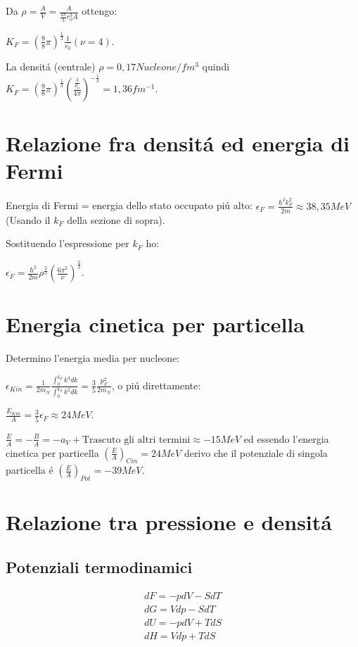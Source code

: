 \documentclass[main.tex]{subfiles}
\begin{document}
Da $\rho=\frac{A}{V}=\frac{A}{\frac{4\pi}{3}r_0^3A}$ ottengo:

$K_F=(\frac{9}{8}\pi)^{\frac{1}{3}}\frac{1}{r_0} (\nu=4)$.

La densit\'a (centrale) $\rho=0,17 Nucleone/fm^3$ quindi $K_F=(\frac{9}{8}\pi)^{\frac{1}{3}}(\frac{\frac{3}{\rho_0}}{4\pi})^{-\frac{1}{3}}=1,36 fm^{-1}$.

\section{Relazione fra densit\'a ed energia di Fermi}

Energia di Fermi = energia dello stato occupato pi\'u alto: $\epsilon_F=\frac{\hbar^2k_F^2}{2m}\approx 38,35 MeV$ (Usando il $k_F$ della sezione di sopra).

Sostituendo l'espressione per $k_F$ ho:

$\epsilon_F=\frac{\hbar^2}{2m}\rho^{\frac{2}{3}}(\frac{6\pi^2}{\nu})^{\frac{2}{3}}$.

\section{Energia cinetica per particella}

Determino l'energia media per nucleone:

$\epsilon_{Kin}=\frac{1}{2m_N}\frac{\int_0^{k_F}k^4dk}{\int_0^{k_F}k^2dk}=\frac{3}{5}\frac{p_F^2}{2m_N}$, o pi\'u direttamente:

$\frac{E_{Kin}}{A}=\frac{3}{5}\epsilon_F \approx 24MeV$.

$\frac{E}{A}=- \frac{B}{A}=-a_V+\text{Trascuto gli altri termini}\approx-15 MeV$ ed essendo l'energia cinetica per particella $(\frac{E}{A})_{Cin}=24 MeV$ derivo che il potenziale di singola particella \'e $(\frac{E}{A})_{Pot}=-39MeV$.

\section{Relazione tra pressione e densit\'a}

\subsection{Potenziali termodinamici}

\begin{align*}
dF=-pdV-SdT\\
dG=Vdp-SdT\\
dU=-pdV+TdS\\
dH=Vdp+TdS
\end{align*}
\end{document}
